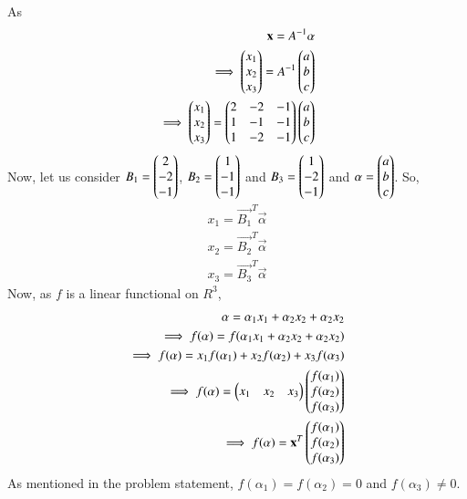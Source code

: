 \documentclass[journal,12pt,twocolumn]{IEEEtran}
\begin{document}
As
\begin{align}
\mathbf{x} = A^{-1} \mathbf{\alpha}\\
\implies \begin{pmatrix}x_1\\x_2\\x_3\end{pmatrix}= A^{-1} \begin{pmatrix}a\\b\\c\end{pmatrix}\\
\implies \begin{pmatrix}x_1\\x_2\\x_3\end{pmatrix}= \begin{pmatrix}2 & -2 & -1\\1 & -1 & -1\\1 & -2 & -1\end{pmatrix} \begin{pmatrix}a\\b\\c\end{pmatrix}
\end{align}
Now, let us consider $B_1 = \begin{pmatrix}2\\-2\\-1\end{pmatrix}$, $B_2 = \begin{pmatrix}1\\-1\\-1\end{pmatrix}$ and $B_3 = \begin{pmatrix}1\\-2\\-1\end{pmatrix}$ and $\mathbf{\alpha} = \begin{pmatrix}a\\b\\c\end{pmatrix}$.
So, 
\begin{align}
x_1 = \vec{B_1}^T \vec{\alpha}\\
x_2 = \vec{B_2}^T \vec{\alpha}\\
x_3 = \vec{B_3}^T \vec{\alpha}
\end{align}
Now, as $f$ is a linear functional on $R^3$,
\begin{align}
\mathbf{\alpha} = \alpha_1 x_1 + \alpha_2 x_2 + \alpha_2 x_2\\
\implies f(\alpha) = f(\alpha_1 x_1 + \alpha_2 x_2 + \alpha_2 x_2)\\
\implies f(\alpha) = x_1 f(\alpha_1) + x_2f(\alpha_2)+ x_3f(\alpha_3)\\
\implies f(\alpha) = \begin{pmatrix}x_1 & x_2 & x_3\end{pmatrix} \begin{pmatrix}f(\alpha_1)\\f(\alpha_2)\\f(\alpha_3)\end{pmatrix}\\
\implies f(\alpha) = \mathbf{x}^T \begin{pmatrix}f(\alpha_1)\\f(\alpha_2)\\f(\alpha_3)\end{pmatrix}
\end{align}
As mentioned in the problem statement, $f(\alpha_1)=f(\alpha_2)=0$ and $f(\alpha_3)\neq 0$.
\end{document}
